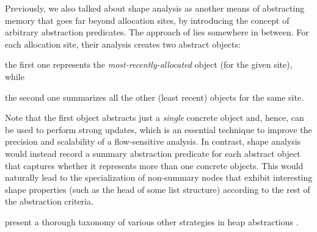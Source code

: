Previously, we also talked about shape analysis
\cite{toplas/SagivRW02,popl/SagivRW99,toplas/SagivRW98} as another
means of abstracting memory that goes far beyond allocation sites, by
introducing the concept of arbitrary abstraction predicates. The
approach of \citeauthor{sas/BalakrishnanR06}
\cite{sas/BalakrishnanR06} lies somewhere in between. For each
allocation site, their analysis creates two abstract objects:
\begin{inparaenum}[(i)]
\item the first one represents the \emph{most-recently-allocated}
  object (for the given site), while
\item the second one summarizes all the other (least recent)
  objects for the same site.
\end{inparaenum}
Note that the first object abstracts just a \emph{single} concrete
object and, hence, can be used to perform strong updates, which is an
essential technique to improve the precision and scalability of a
flow-sensitive analysis.
%
In contrast, shape analysis would instead record a summary abstraction
predicate for each abstract object that captures whether it represents
more than one concrete objects. This would naturally lead to the
specialization of non-summary nodes that exhibit interesting shape
properties (such as the head of some list structure) according to the
rest of the abstraction criteria.

\citeauthor{journals/corr/KanvarK14} present a thorough taxonomy of
various other strategies in heap abstractions
\cite{journals/corr/KanvarK14}.



